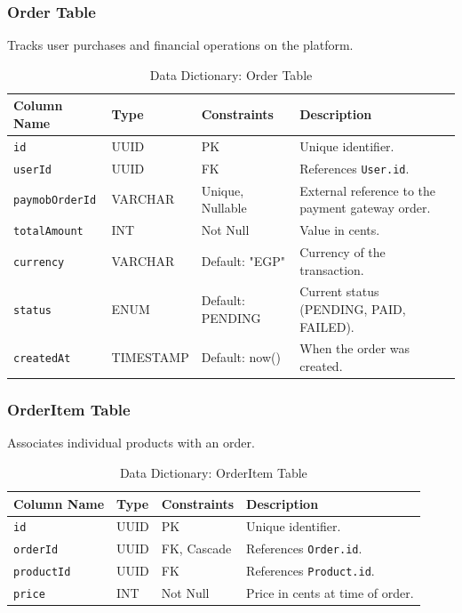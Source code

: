 \subsubsection{Order Table}
Tracks user purchases and financial operations on the platform.
\begin{table}[H]
\centering
\renewcommand{\arraystretch}{1.3}
\begin{tabularx}{\textwidth}{|l|l|l|X|}
\hline
\textbf{Column Name} & \textbf{Type} & \textbf{Constraints} & \textbf{Description} \\
\hline
\texttt{id} & UUID & PK & Unique identifier. \\
\hline
\texttt{userId} & UUID & FK & References \texttt{User.id}. \\
\hline
\texttt{paymobOrderId} & VARCHAR & Unique, Nullable & External reference to the payment gateway order. \\
\hline
\texttt{totalAmount} & INT & Not Null & Value in cents. \\
\hline
\texttt{currency} & VARCHAR & Default: "EGP" & Currency of the transaction. \\
\hline
\texttt{status} & ENUM & Default: PENDING & Current status (PENDING, PAID, FAILED). \\
\hline
\texttt{createdAt} & TIMESTAMP & Default: now() & When the order was created. \\
\hline
\end{tabularx}
\caption{Data Dictionary: Order Table}
\label{tab:dict-order}
\end{table}

\subsubsection{OrderItem Table}
Associates individual products with an order.
\begin{table}[H]
\centering
\renewcommand{\arraystretch}{1.3}
\begin{tabularx}{\textwidth}{|l|l|l|X|}
\hline
\textbf{Column Name} & \textbf{Type} & \textbf{Constraints} & \textbf{Description} \\
\hline
\texttt{id} & UUID & PK & Unique identifier. \\
\hline
\texttt{orderId} & UUID & FK, Cascade & References \texttt{Order.id}. \\
\hline
\texttt{productId} & UUID & FK & References \texttt{Product.id}. \\
\hline
\texttt{price} & INT & Not Null & Price in cents at time of order. \\
\hline
\end{tabularx}
\caption{Data Dictionary: OrderItem Table}
\label{tab:dict-orderitem}
\end{table}

